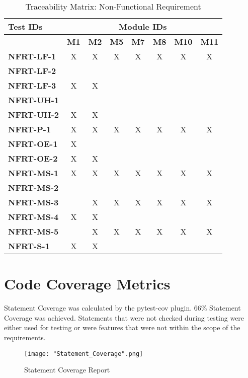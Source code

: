 \documentclass[12pt, titlepage]{article}
\begin{document}
\begin{table}[H]
    \centering
    \caption{Traceability Matrix: Non-Functional Requirement}
    \begin{adjustbox}{max width=0.7\paperwidth}
    \begin{tabular}{l|ccccccc}
        \textbf{Test IDs} & \multicolumn{7}{c}{\textbf{Module IDs}}\\
        \hline
        ~ & \textbf{M1} & \textbf{M2} & \textbf{M5} & \textbf{M7} & \textbf{M8} & \textbf{M10} & \textbf{M11}\\
        \textbf{NFRT-LF-1}  & X & X & X & X & X & X & X\\
        \textbf{NFRT-LF-2}  & ~ & ~ & ~ & ~ & ~ & ~ & ~\\
        \textbf{NFRT-LF-3}  & X & X & ~ & ~ & ~ & ~ & ~\\
        \textbf{NFRT-UH-1}  & ~ & ~ & ~ & ~ & ~ & ~ & ~\\
        \textbf{NFRT-UH-2}  & X & X & ~ & ~ & ~ & ~ & ~\\
        \textbf{NFRT-P-1}   & X & X & X & X & X & X & X\\
        \textbf{NFRT-OE-1}  & X & ~ & ~ & ~ & ~ & ~ & ~\\
        \textbf{NFRT-OE-2}  & X & X & ~ & ~ & ~ & ~ & ~\\
        \textbf{NFRT-MS-1}  & X & X & X & X & X & X & X\\
        \textbf{NFRT-MS-2}  & ~ & ~ & ~ & ~ & ~ & ~ & ~\\
        \textbf{NFRT-MS-3}  & ~ & X & X & X & X & X & X\\
        \textbf{NFRT-MS-4}  & X & X & ~ & ~ & ~ & ~ & ~\\
        \textbf{NFRT-MS-5}  & ~ & X & X & X & X & X & X\\
        \textbf{NFRT-S-1}   & X & X & ~ & ~ & ~ & ~ & ~\\
    \end{tabular}
    \end{adjustbox}
\end{table}

\section{Code Coverage Metrics}
Statement Coverage was calculated by the pytest-cov plugin. 66\% Statement Coverage was achieved. Statements that were not checked during testing were either used for testing or were features that were not within the scope of the requirements.
\begin{figure}[H]
    \centering
    \texttt{[image: "Statement\_Coverage".png]}
    \caption{Statement Coverage Report}
\end{figure}




\end{document}
